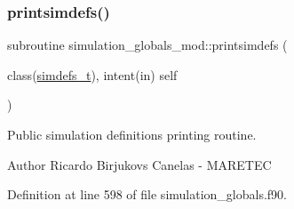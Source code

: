 \subsubsection{\texorpdfstring{printsimdefs()}{printsimdefs()}}
{\footnotesize\ttfamily subroutine simulation\+\_\+globals\+\_\+mod\+::printsimdefs (\begin{DoxyParamCaption}\item[{class(\mbox{\hyperlink{structsimulation__globals__mod_1_1simdefs__t}{simdefs\+\_\+t}}), intent(in)}]{self }\end{DoxyParamCaption})\hspace{0.3cm}{\ttfamily [private]}}



Public simulation definitions printing routine. 

\begin{DoxyAuthor}{Author}
Ricardo Birjukovs Canelas -\/ M\+A\+R\+E\+T\+EC 
\end{DoxyAuthor}


Definition at line 598 of file simulation\+\_\+globals.\+f90.


